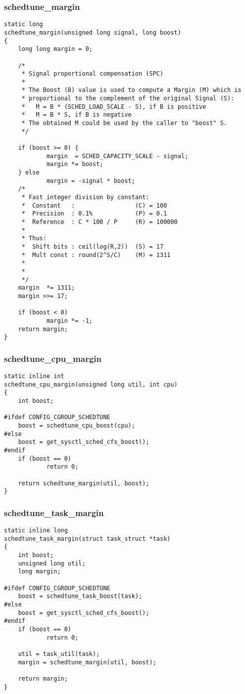 \documentclass{article}
\begin{document}
\subsubsection{schedtune\_margin}

\begin{verbatim}
static long
schedtune_margin(unsigned long signal, long boost)
{
    long long margin = 0;

    /*
     * Signal proportional compensation (SPC)
     *
     * The Boost (B) value is used to compute a Margin (M) which is
     * proportional to the complement of the original Signal (S):
     *   M = B * (SCHED_LOAD_SCALE - S), if B is positive
     *   M = B * S, if B is negative
     * The obtained M could be used by the caller to "boost" S.
     */

    if (boost >= 0) {
            margin  = SCHED_CAPACITY_SCALE - signal;
            margin *= boost;
    } else
            margin = -signal * boost;
    /*
     * Fast integer division by constant:
     *  Constant   :                 (C) = 100
     *  Precision  : 0.1%            (P) = 0.1
     *  Reference  : C * 100 / P     (R) = 100000
     *
     * Thus:
     *  Shift bits : ceil(log(R,2))  (S) = 17
     *  Mult const : round(2^S/C)    (M) = 1311
     *
     *
     */
    margin  *= 1311;
    margin >>= 17;

    if (boost < 0)
            margin *= -1;
    return margin;
}
\end{verbatim}

\subsubsection{schedtune\_cpu\_margin}

\begin{verbatim}
static inline int
schedtune_cpu_margin(unsigned long util, int cpu)
{
    int boost;

#ifdef CONFIG_CGROUP_SCHEDTUNE
    boost = schedtune_cpu_boost(cpu);
#else
    boost = get_sysctl_sched_cfs_boost();
#endif
    if (boost == 0)
            return 0;

    return schedtune_margin(util, boost);
}
\end{verbatim}

\subsubsection{schedtune\_task\_margin}

\begin{verbatim}
static inline long
schedtune_task_margin(struct task_struct *task)
{
    int boost;
    unsigned long util;
    long margin;

#ifdef CONFIG_CGROUP_SCHEDTUNE
    boost = schedtune_task_boost(task);
#else
    boost = get_sysctl_sched_cfs_boost();
#endif
    if (boost == 0)
            return 0;

    util = task_util(task);
    margin = schedtune_margin(util, boost);

    return margin;
}
\end{verbatim}
\end{document}
